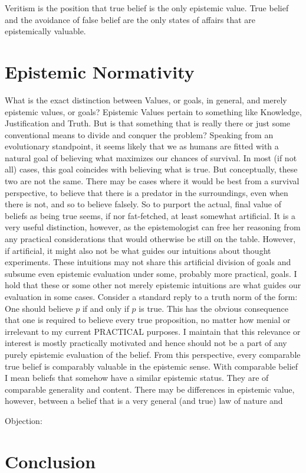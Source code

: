 \documentclass[12pt,numbers=noenddot]{scrartcl}
\begin{document}
Veritism is the position that true belief is the only epistemic value. True belief and the avoidance of false belief are the only states of affairs that are epistemically valuable.

\section{Epistemic Normativity}

What is the exact distinction between Values, or goals, in general, and merely epistemic values, or goals? Epistemic Values pertain to something like Knowledge, Justification and Truth. But is that something that is really there or just some conventional means to divide and conquer the problem? Speaking from an evolutionary standpoint, it seems likely that we as humans are fitted with a natural goal of believing what maximizes our chances of survival. In most (if not all) cases, this goal coincides with believing what is true. But conceptually, these two are not the same. There may be cases where it would be best from a survival perspective, to believe that there is a predator in the surroundings, even when there is not, and so to believe falsely. So to purport the actual, final value of beliefs as being true seems, if nor fat-fetched, at least somewhat artificial. It is a very useful distinction, however, as the epistemologist can free her reasoning from any practical considerations that would otherwise be still on the table. However, if artificial, it might also not be what guides our intuitions about thought experiments. These intuitions may not share this artificial division of goals and subsume even epistemic evaluation under some, probably more practical, goals. I hold that these or some other not merely epistemic intuitions are what guides our evaluation in some cases. Consider a standard reply to a truth norm of the form: One should believe $p$ if and only if $p$ is true. This has the obvious consequence that one is required to believe every true proposition, no matter how menial or irrelevant to my current PRACTICAL purposes. I maintain that this relevance or interest is mostly practically motivated and hence should not be a part of any purely epistemic evaluation of the belief. From this perspective, every comparable true belief is comparably valuable in the epistemic sense. With comparable belief I mean beliefs that somehow have a similar epistemic status. They are of comparable generality and content. There may be differences in epistemic value, however, between a belief that is a very general (and true) law of nature and

Objection: 

\nocite{sep-value-theory,Goldman2002-GOLTUO-2,James1896-JAMTWT-19,James1907-JAMP,Zagzebski2004-ZAGEVM-2,Berker2013-BERETA-2,Berker2013-BERTRO-24,Goldman2015-GOLRVA,Berker2015-BERRTG-2}

\section{Conclusion}

\printbibliography
\end{document}

